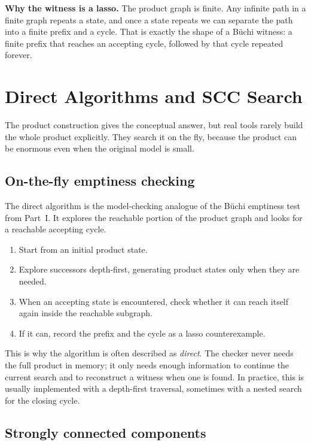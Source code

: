 \medskip\noindent
\textbf{Why the witness is a lasso.}  The product graph is finite.  Any
infinite path in a finite graph repeats a state, and once a state repeats we
can separate the path into a finite prefix and a cycle.  That is exactly the
shape of a B\"uchi witness: a finite prefix that reaches an accepting cycle,
followed by that cycle repeated forever.

\section{Direct Algorithms and SCC Search}
\label{sec:ltl-mc-direct}

The product construction gives the conceptual answer, but real tools rarely
build the whole product explicitly.  They search it on the fly, because the
product can be enormous even when the original model is small.

\subsection{On-the-fly emptiness checking}

The direct algorithm is the model-checking analogue of the Büchi emptiness
test from Part~I.  It explores the reachable portion of the product graph
and looks for a reachable accepting cycle.

\begin{enumerate}
  \item Start from an initial product state.
  \item Explore successors depth-first, generating product states only when
        they are needed.
  \item When an accepting state is encountered, check whether it can reach
        itself again inside the reachable subgraph.
  \item If it can, record the prefix and the cycle as a lasso counterexample.
\end{enumerate}

This is why the algorithm is often described as \emph{direct}.  The checker
never needs the full product in memory; it only needs enough information to
continue the current search and to reconstruct a witness when one is found.
In practice, this is usually implemented with a depth-first traversal,
sometimes with a nested search for the closing cycle.

\subsection{Strongly connected components}

